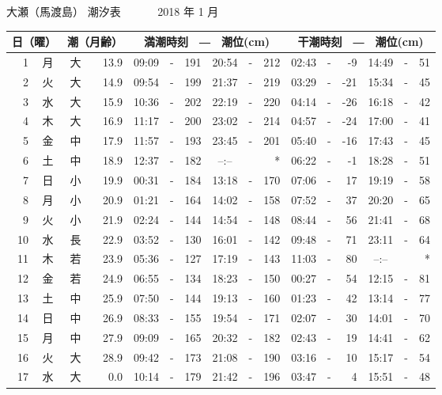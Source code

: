 \documentclass[12pt.a4j]{jsarticle}
\begin{document}
\pagestyle{empty}
\begin{center}
{\LARGE 大瀬（馬渡島）  潮汐表　　　}
{\large 2018 年  1 月}\\
\begin{table}[ht]
\begin{tabular}{|rc|cr|ccrccr|ccrccr|}
\hline
\multicolumn{2}{|c|}{日（曜）} & \multicolumn{2}{c|}{潮（月齢）} & \multicolumn{6}{c|}{満潮時刻　―　潮位(cm)} & \multicolumn{6}{c|}{干潮時刻　―　潮位(cm)} \\
\hline
 1 & 月 & 大 & 13.9 & 09:09 &-& 191 & 20:54 &-& 212 & 02:43 &-&  -9 & 14:49 &-&  51 \\
 2 & 火 & 大 & 14.9 & 09:54 &-& 199 & 21:37 &-& 219 & 03:29 &-& -21 & 15:34 &-&  45 \\
 3 & 水 & 大 & 15.9 & 10:36 &-& 202 & 22:19 &-& 220 & 04:14 &-& -26 & 16:18 &-&  42 \\
 4 & 木 & 大 & 16.9 & 11:17 &-& 200 & 23:02 &-& 214 & 04:57 &-& -24 & 17:00 &-&  41 \\
 5 & 金 & 中 & 17.9 & 11:57 &-& 193 & 23:45 &-& 201 & 05:40 &-& -16 & 17:43 &-&  45 \\
 6 & 土 & 中 & 18.9 & 12:37 &-& 182 & --:-- & &  *  & 06:22 &-&  -1 & 18:28 &-&  51 \\
 7 & 日 & 小 & 19.9 & 00:31 &-& 184 & 13:18 &-& 170 & 07:06 &-&  17 & 19:19 &-&  58 \\
 8 & 月 & 小 & 20.9 & 01:21 &-& 164 & 14:02 &-& 158 & 07:52 &-&  37 & 20:20 &-&  65 \\
 9 & 火 & 小 & 21.9 & 02:24 &-& 144 & 14:54 &-& 148 & 08:44 &-&  56 & 21:41 &-&  68 \\
10 & 水 & 長 & 22.9 & 03:52 &-& 130 & 16:01 &-& 142 & 09:48 &-&  71 & 23:11 &-&  64 \\
11 & 木 & 若 & 23.9 & 05:36 &-& 127 & 17:19 &-& 143 & 11:03 &-&  80 & --:-- & &  *  \\
12 & 金 & 若 & 24.9 & 06:55 &-& 134 & 18:23 &-& 150 & 00:27 &-&  54 & 12:15 &-&  81 \\
13 & 土 & 中 & 25.9 & 07:50 &-& 144 & 19:13 &-& 160 & 01:23 &-&  42 & 13:14 &-&  77 \\
14 & 日 & 中 & 26.9 & 08:33 &-& 155 & 19:54 &-& 171 & 02:07 &-&  30 & 14:01 &-&  70 \\
15 & 月 & 中 & 27.9 & 09:09 &-& 165 & 20:32 &-& 182 & 02:43 &-&  19 & 14:41 &-&  62 \\
16 & 火 & 大 & 28.9 & 09:42 &-& 173 & 21:08 &-& 190 & 03:16 &-&  10 & 15:17 &-&  54 \\
17 & 水 & 大 &  0.0 & 10:14 &-& 179 & 21:42 &-& 196 & 03:47 &-&   4 & 15:51 &-&  48 \\

\end{tabular}
\end{table}
\end{center}
\end{document}
